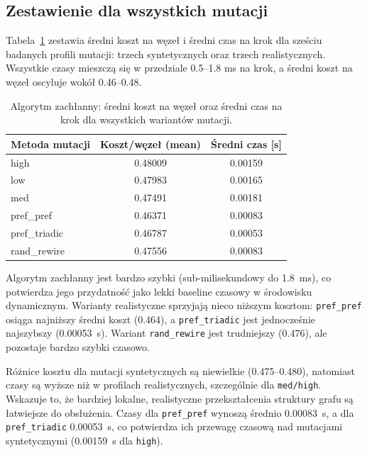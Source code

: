 \subsection{Zestawienie dla wszystkich mutacji}
Tabela~\ref{tab:greedy-cold-summary} zestawia średni koszt na węzeł i średni czas na krok dla sześciu badanych profili mutacji: trzech syntetycznych oraz trzech realistycznych. Wszystkie czasy mieszczą się w przedziale 0.5--1.8 ms na krok, a średni koszt na węzeł oscyluje wokół 0.46--0.48.

\begin{table}[H]
  \centering
  \caption{Algorytm zachłanny: średni koszt na węzeł oraz średni czas na krok dla wszystkich wariantów mutacji.}
  \label{tab:greedy-cold-summary}
  \begin{tabular}{lcc}
    \toprule
    \textbf{Metoda mutacji} & \textbf{Koszt/węzeł (mean)} & \textbf{Średni czas [s]} \\
    \midrule
    high                    & 0.48009                     & 0.00159                  \\
    low                     & 0.47983                     & 0.00165                  \\
    med                     & 0.47491                     & 0.00181                  \\
    pref\_pref              & 0.46371                     & 0.00083                  \\
    pref\_triadic           & 0.46787                     & 0.00053                  \\
    rand\_rewire            & 0.47556                     & 0.00083                  \\
    \bottomrule
  \end{tabular}
\end{table}

Algorytm zachłanny jest bardzo szybki (sub-milisekundowy do \SI{1.8}{\ms}), co potwierdza jego przydatność jako lekki baseline czasowy w środowisku dynamicznym. Warianty realistyczne sprzyjają nieco niższym kosztom: \texttt{pref\_pref} osiąga najniższy średni koszt (0.464), a \texttt{pref\_triadic} jest jednocześnie najszybszy (\SI{0.00053}{\s}). Wariant \texttt{rand\_rewire} jest trudniejszy (0.476), ale pozostaje bardzo szybki czasowo.

Różnice kosztu dla mutacji syntetycznych są niewielkie (0.475--0.480), natomiast czasy są wyższe niż w profilach realistycznych, szczególnie dla \texttt{med/high}. Wskazuje to, że bardziej lokalne, realistyczne przekształcenia struktury grafu są łatwiejsze do obsłużenia. Czasy dla \texttt{pref\_pref} wynoszą średnio \SI{0.00083}{\s}, a dla \texttt{pref\_triadic} \SI{0.00053}{\s}, co potwierdza ich przewagę czasową nad mutacjami syntetycznymi (\SI{0.00159}{\s} dla \texttt{high}).

